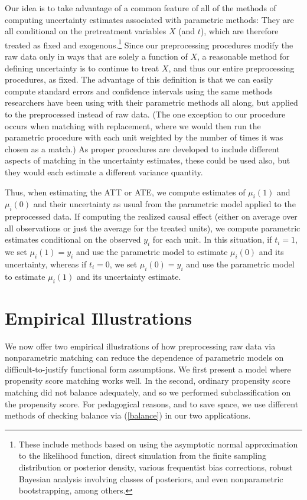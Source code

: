 \documentclass[11pt,titlepage]{article}
\begin{document}
Our idea is to take advantage of a common feature of all of the
methods of computing uncertainty estimates associated with parametric
methods: They are all conditional on the pretreatment variables $X$
(and $t$), which are therefore treated as fixed and
exogenous.\footnote{These include methods based on using the
  asymptotic normal approximation to the likelihood function, direct
  simulation from the finite sampling distribution or posterior
  density, various frequentist bias corrections, robust Bayesian
  analysis involving classes of posteriors, and even nonparametric
  bootstrapping, among others.}  Since our preprocessing procedures
modify the raw data only in ways that are solely a function of $X$, a
reasonable method for defining uncertainty is to continue to treat
$X$, and thus our entire preprocessing procedures, as fixed.  The
advantage of this definition is that we can easily compute standard
errors and confidence intervals using the same methods researchers
have been using with their parametric methods all along, but applied
to the preprocessed instead of raw data.  (The one exception to our
procedure occurs when matching with replacement, where we would then
run the parametric procedure with each unit weighted by the number of
times it was chosen as a match.)  As proper procedures are developed
to include different aspects of matching in the uncertainty estimates,
these could be used also, but they would each estimate a different
variance quantity.

Thus, when estimating the ATT or ATE, we compute estimates of
$\mu_i(1)$ and $\mu_i(0)$ and their uncertainty as usual from the
parametric model applied to the preprocessed data.  If computing the
realized causal effect (either on average over all observations or
just the average for the treated units), we compute parametric
estimates conditional on the observed $y_i$ for each unit.  In this
situation, if $t_i=1$, we set $\mu_i(1)=y_i$ and use the parametric
model to estimate $\mu_i(0)$ and its uncertainty, whereas if $t_i=0$,
we set $\mu_i(0)=y_i$ and use the parametric model to estimate
$\mu_i(1)$ and its uncertainty estimate.

\section{Empirical Illustrations}

We now offer two empirical illustrations of how preprocessing raw data
via nonparametric matching can reduce the dependence of parametric
models on difficult-to-justify functional form assumptions.  We first
present a model where propensity score matching works well.  In the
second, ordinary propensity score matching did not balance adequately,
and so we performed subclassification on the propensity score.  For
pedagogical reasons, and to save space, we use different methods of
checking balance via (\ref{balance}) in our two applications.
\end{document}
